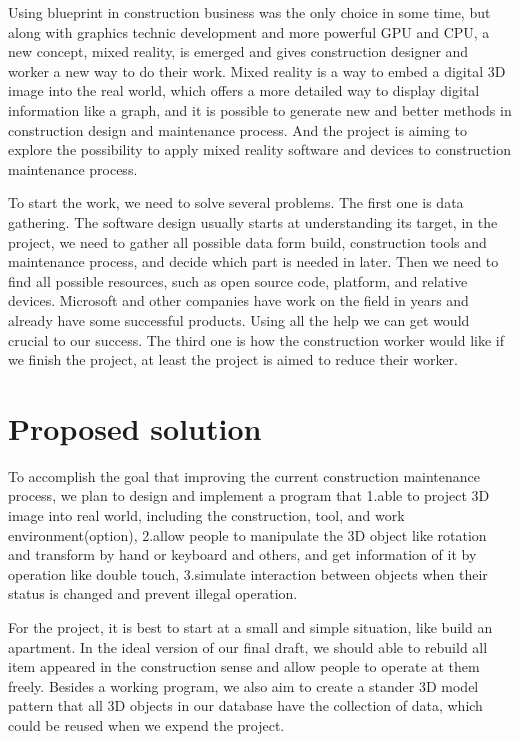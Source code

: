 \documentclass[10pt,letter paper]{article}
\begin{document}
    Using blueprint in construction business was the only choice in some time, but along with graphics technic development and more powerful GPU and CPU, a new concept, mixed reality, is emerged and gives construction designer and worker a new way to do their work. Mixed reality is a way to embed a digital 3D image into the real world, which offers a more detailed way to display digital information like a graph, and it is possible to generate new and better methods in construction design and maintenance process. And the project is aiming to explore the possibility to apply mixed reality software and devices to construction maintenance process.\newline \par
    
    To start the work, we need to solve several problems. The first one is data gathering. The software design usually starts at understanding its target, in the project, we need to gather all possible data form build, construction tools and maintenance process, and decide which part is needed in later. Then we need to find all possible resources, such as open source code, platform, and relative devices. Microsoft and other companies have work on the field in years and already have some successful products. Using all the help we can get would crucial to our success. The third one is how the construction worker would like if we finish the project, at least the project is aimed to reduce their worker.\newline \par


\section*{Proposed solution }
    \bigskip
    To accomplish the goal that improving the current construction maintenance process, we plan to design and implement a program that 1.able to project 3D image into real world, including the construction, tool, and work environment(option), 2.allow people to manipulate the 3D object like rotation and transform by hand or keyboard and others, and get information of it by operation like double touch, 3.simulate interaction between objects when their status is changed and prevent illegal operation.\newline \par
    
    For the project, it is best to start at a small and simple situation, like build an apartment. In the ideal version of our final draft, we should able to rebuild all item appeared in the construction sense and allow people to operate at them freely. Besides a working program, we also aim to create a stander 3D model pattern that all 3D objects in our database have the collection of data, which could be reused when we expend the project.\newline \par
    
\end{document}
